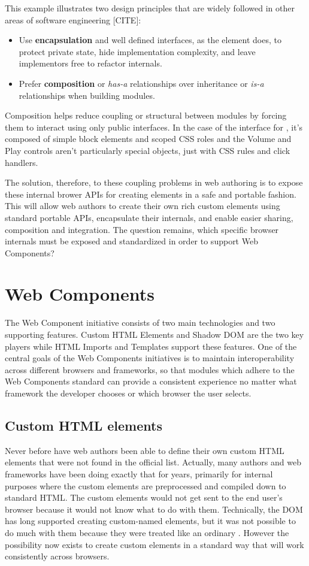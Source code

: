 This example illustrates two design principles that are widely followed in other areas of software engineering [CITE]:
\begin{itemize}
\item Use \textbf{encapsulation} and well defined interfaces, as the  element does, to protect private state, hide implementation complexity, and leave implementors free to refactor internals.
\item Prefer \textbf{composition} or \textit{has-a} relationships over inheritance or \textit{is-a} relationships when building modules. 
\end{itemize}

Composition helps reduce coupling or structural between modules by forcing them to interact using only public interfaces.
In the case of the interface for , it's composed of simple block elements and scoped CSS roles and the Volume and Play controls aren't particularly special objects, just  with CSS rules and click handlers.

The solution, therefore, to these coupling problems in web authoring is to expose these internal brower APIs for creating elements in a safe and portable fashion. 
This will allow web authors to create their own rich custom elements using standard portable APIs, encapsulate their internals, and enable easier sharing, composition and integration.
The question remains, which specific browser internals must be exposed and standardized in order to support Web Components?

\section{Web Components}

The Web Component initiative consists of two main technologies and two supporting features. 
Custom HTML Elements and Shadow DOM are the two key players while HTML Imports and Templates support these features. One of the central goals of the Web Components initiatives is to maintain interoperability across different browsers and frameworks, so that modules which adhere to the Web Components standard can provide a consistent experience no matter what framework the developer chooses or which browser the user selects.

\subsection{Custom HTML elements}
Never before have web authors been able to define their own custom HTML elements that were not found in the official list.
Actually, many authors and web frameworks have been doing exactly that for years, primarily for internal purposes where the custom elements are pre\-processed and compiled down to standard HTML.
The custom elements would not get sent to the end user's browser because it would not know what to do with them.
Technically, the DOM has long supported creating custom-named elements, but it was not possible to do much with them because they were treated like an ordinary .
However the possibility now exists to create custom elements in a standard way that will work consistently across browsers. 

